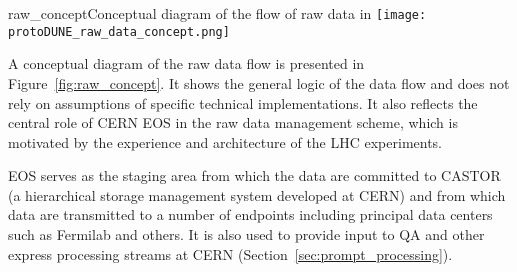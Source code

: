 \begin{cdrfigure}{raw_concept}{Conceptual diagram of the flow of raw data in \pdsp} 
\texttt{[image: protoDUNE\_raw\_data\_concept.png]}
\end{cdrfigure}



A conceptual diagram of the raw data flow is presented in Figure~\ref{fig:raw_concept}. It shows the general logic
of the data flow and does not rely on assumptions of specific technical implementations. 
It also reflects the central role of CERN EOS in the raw data management scheme, which is motivated by the experience
and architecture of the LHC experiments.

EOS serves as the staging area from which the data are committed to CASTOR (a hierarchical storage management system developed at CERN)
and from which data are transmitted to a number of endpoints including principal data centers such as Fermilab and others.
It is also used to provide input to QA and other express processing streams at CERN (Section~\ref{sec:prompt_processing}).


